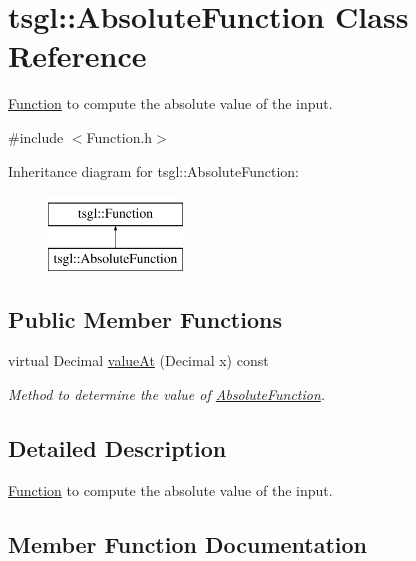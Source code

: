 \hypertarget{classtsgl_1_1_absolute_function}{}\section{tsgl\+:\+:Absolute\+Function Class Reference}
\label{classtsgl_1_1_absolute_function}


\hyperlink{classtsgl_1_1_function}{Function} to compute the absolute value of the input.  




{\ttfamily \#include $<$Function.\+h$>$}

Inheritance diagram for tsgl\+:\+:Absolute\+Function\+:\begin{figure}[H]
\begin{center}
\leavevmode
\includegraphics[height=2.000000cm]{classtsgl_1_1_absolute_function}
\end{center}
\end{figure}
\subsection*{Public Member Functions}
\begin{DoxyCompactItemize}
\item 
virtual Decimal \hyperlink{classtsgl_1_1_absolute_function_a29b4dd051d17e92b4f2d64b492a6ca19}{value\+At} (Decimal x) const 
\begin{DoxyCompactList}\small\item\em Method to determine the value of \hyperlink{classtsgl_1_1_absolute_function}{Absolute\+Function}. \end{DoxyCompactList}\end{DoxyCompactItemize}


\subsection{Detailed Description}
\hyperlink{classtsgl_1_1_function}{Function} to compute the absolute value of the input. 

\subsection{Member Function Documentation}
\hypertarget{classtsgl_1_1_absolute_function_a29b4dd051d17e92b4f2d64b492a6ca19}{}
